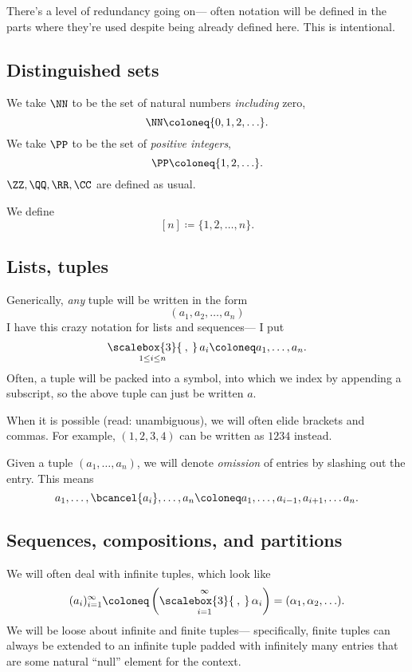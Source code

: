 \documentclass{article}
\newcommand{\bigcomma}{\ensuremath{\mathop{\scalebox{3}{\:,\:}}\limits}}
\begin{document}
There's a level of redundancy going on--- often notation will be defined in the parts where they're used despite being already defined here.
This is intentional.
\fi


\subsection*{Distinguished sets}

We take $\NN$ to be the set of natural numbers \textit{including} zero,
\[
    \NN
    \coloneq
    \{0,1,2,\ldots\}.
\]
We take $\PP$ to be the set of \textit{positive integers},
\[
    \PP
    \coloneq
    \{1,2,\ldots\}.
\]
$\ZZ,\QQ,\RR,\CC$ are defined as usual.

We define
\[
    [n]
    \coloneq
    \{1,2,\ldots,n\}.
\]

\subsection*{Lists, tuples}

Generically, \textit{any} tuple will be written in the form
\[
    (a_1, a_2, \ldots, a_n)
\]
I have this crazy notation for lists and sequences--- I put
\[
    \bigcomma_{1\leq i \leq n}a_i
    \coloneq
    a_1,\ldots,a_n.
\]
Often, a tuple will be packed into a symbol, into which we index by appending a subscript, so the above tuple can just be written $a$.

When it is possible (read: unambiguous), we will often elide brackets and commas. 
For example, $(1,2,3,4)$ can be written as $1234$ instead.

Given a tuple $(a_1,\ldots,a_n)$, we will denote \textit{omission} of entries by slashing out the entry.
This means
\[
    a_1,\ldots,\bcancel{a_i},\ldots,a_n
    \coloneq
    a_1,\ldots,a_{i-1},a_{i+1},\ldots a_n.
\]

\subsection*{Sequences, compositions, and partitions}

We will often deal with infinite tuples, which look like
\[
    (a_i)_{i=1}^\infty
    \coloneq
    \left(
        \bigcomma_{i=1}^\infty \alpha_i
    \right)
    =
    (\alpha_1, \alpha_2, \ldots).
\]
We will be loose about infinite and finite tuples--- specifically, finite tuples can always be extended to an infinite tuple padded with infinitely many entries that are some natural ``null'' element for the context.
\end{document}
